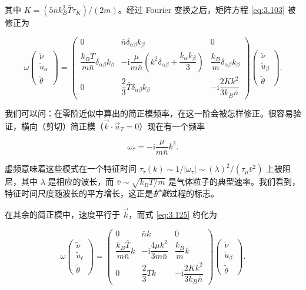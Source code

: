 其中 $K=(5\bar nk_B^2\bar T\tau_K)/(2m)$。经过 Fourier 变换之后，矩阵方程 \eqref{eq:3.103} 被修正为

\begin{equation}\label{eq:3.125}
  \omega\begin{pmatrix}\tilde\nu\\ \tilde u_\alpha\\ \tilde\theta\end{pmatrix}=
  \begin{pmatrix}
    0 & \bar n\delta_{\alpha\beta}k_\beta & 0\\[6pt]
    \dfrac{k_B\bar T}{m\bar n}\delta_{\alpha\beta}k_\beta & -\mathrm{i}\dfrac{\mu}{m\bar n}\left(k^2\delta_{\alpha\beta}+\dfrac{k_\alpha k_\beta}{3}\right) & \dfrac{k_B}{m}\delta_{\alpha\beta}k_\beta\\[10pt]
    0 & \dfrac{2}{3}\bar T\delta_{\alpha\beta}k_\beta & -\mathrm{i}\dfrac{2Kk^2}{3k_B\bar n}
  \end{pmatrix}
  \begin{pmatrix}\tilde\nu\\ \tilde u_\beta\\ \tilde\theta\end{pmatrix}.
\end{equation}

我们可以问：在零阶近似中算出的简正模频率，在这一阶会被怎样修正。很容易验证，横向（剪切）简正模（$\vec k\cdot\vec u_T=0$）现在有一个频率

\begin{equation}\label{eq:3.126}
  \omega_\tau=-\mathrm{i}\frac{\mu}{m\bar n}k^2.
\end{equation}

虚频意味着这些模式在一个特征时间 $\tau_\tau(k)\sim1/|\omega_\tau|\sim(\lambda)^2/(\tau_\mu\bar v^2)$ 上被阻尼，其中 $\lambda$ 是相应的波长，而 $\bar v\sim\sqrt{k_BT/m}$ 是气体粒子的典型速率。我们看到，特征时间尺度随波长的平方增长，这正是\emph{扩散}过程的标志。

在其余的简正模中，速度平行于 $\vec k$，而式 \eqref{eq:3.125} 约化为

\begin{equation}\label{eq:3.127}
  \omega\begin{pmatrix}\tilde\nu\\ \tilde u_\ell\\ \tilde\theta\end{pmatrix}=
  \begin{pmatrix}
    0 & \bar nk & 0\\[6pt]
    \dfrac{k_B\bar T}{m\bar n}k & -\mathrm{i}\dfrac{4\mu k^2}{3m\bar n} & \dfrac{k_B}{m}k\\[10pt]
    0 & \dfrac{2}{3}\bar Tk & -\mathrm{i}\dfrac{2Kk^2}{3k_B\bar n}
  \end{pmatrix}
  \begin{pmatrix}\tilde\nu\\ \tilde u_\beta\\ \tilde\theta\end{pmatrix}.
\end{equation}

